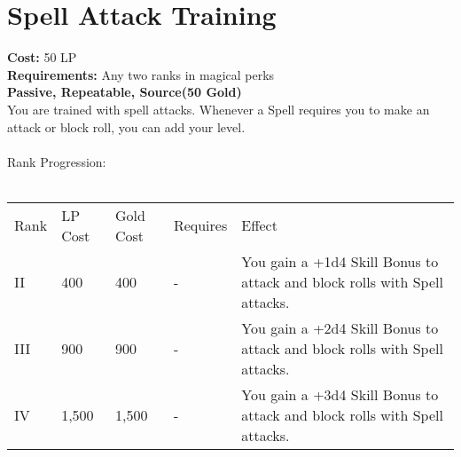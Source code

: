 \section{Spell Attack Training}\label{perk:spellAttackTraining}
\textbf{Cost:} 50 LP\\
\textbf{Requirements:} Any two ranks in magical perks\\
\textbf{Passive, Repeatable, Source(50 Gold)}\\
You are trained with spell attacks.
Whenever a Spell requires you to make an attack or block roll, you can add your level.\\
\\
Rank Progression:\\
\\
\begin{longtable}{l | l | l | l | p{9cm}}
	Rank & LP Cost & Gold Cost & Requires & Effect\\
	II & 400 & 400 & - & You gain a +1d4 Skill Bonus to attack and block rolls with Spell attacks.\\
	III & 900 & 900 & - & You gain a +2d4 Skill Bonus to attack and block rolls with Spell attacks.\\
	IV & 1,500 & 1,500 & - & You gain a +3d4 Skill Bonus to attack and block rolls with Spell attacks.\\
\end{longtable}